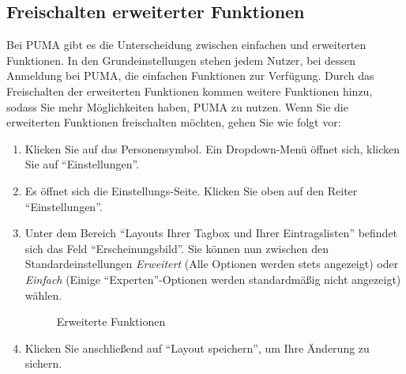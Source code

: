 \subsection{Freischalten erweiterter Funktionen}
Bei PUMA gibt es die Unterscheidung zwischen einfachen und erweiterten Funktionen. In den Grundeinstellungen stehen jedem Nutzer, bei dessen Anmeldung bei PUMA, die einfachen Funktionen zur Verfügung. Durch das Freischalten der erweiterten Funktionen kommen weitere Funktionen hinzu, sodass Sie mehr Möglichkeiten haben, PUMA zu nutzen.  Wenn Sie die erweiterten Funktionen freischalten möchten, gehen Sie wie folgt vor:
\begin{enumerate}
    \item Klicken Sie auf das Personensymbol. Ein Dropdown-Menü öffnet sich, klicken Sie auf \enquote{Einstellungen}.
    \item Es öffnet sich die Einstellungs-Seite. Klicken Sie oben auf den Reiter \enquote{Einstellungen}.
    \item Unter dem Bereich \enquote{Layouts Ihrer Tagbox und Ihrer Eintragslisten} befindet sich das Feld \enquote{Erscheinungsbild}. Sie können nun zwischen den Standardeinstellungen \textit{Erweitert} (Alle Optionen werden stets angezeigt) oder \textit{Einfach} (Einige \enquote{Experten}-Optionen werden standardmäßig nicht angezeigt) wählen.
    \begin{figure}[h!]
 \centering
 \caption{Erweiterte Funktionen}
 \label{figure3}
\end{figure} 
    \item Klicken Sie anschließend auf \enquote{Layout speichern}, um Ihre Änderung zu sichern.
\end{enumerate}